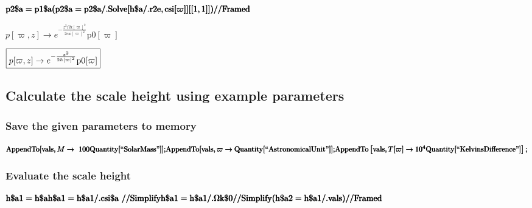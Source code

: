 \documentclass{article}
\begin{document}
\begin{doublespace}
\noindent\(\pmb{\text{p2$\$$a} =\text{p1$\$$a}}\\
\pmb{(\text{p2$\$$a} =\text{p2$\$$a} \text{/.} \text{Solve}[\text{h$\$$a} \text{/.} \text{r2e}, \text{csi}[\varpi ]][[1,1]]) \text{//}\text{Framed}}\)
\end{doublespace}

\begin{doublespace}
\noindent\(p[\varpi ,z]\to e^{-\frac{z^2 \text{$\Omega $k}[\varpi ]^2}{2 \text{csi}[\varpi ]^2}} \text{p0}[\varpi ]\)
\end{doublespace}

\begin{doublespace}
\noindent\(\fbox{$p[\varpi ,z]\to e^{-\frac{z^2}{2 h[\varpi ]^2}} \text{p0}[\varpi ]$}\)
\end{doublespace}

\subsection*{Calculate the scale height using example parameters}

\subsubsection*{Save the given parameters to memory}

\begin{doublespace}
\noindent\(\pmb{\text{AppendTo}[\text{vals},M \to \text{  }100\text{Quantity}[\text{{``}SolarMass{''}}]];}\\
\pmb{\text{AppendTo}[\text{vals},\varpi \to  \text{Quantity}[\text{{``}AstronomicalUnit{''}}]];}\\
\pmb{\text{AppendTo}\left[\text{vals},T[\varpi ]\to  10^4\text{Quantity}[\text{{``}KelvinsDifference{''}}]\right];}\)
\end{doublespace}

\subsubsection*{Evaluate the scale height}

\begin{doublespace}
\noindent\(\pmb{\text{h$\$$a1} = \text{h$\$$a}}\\
\pmb{\text{h$\$$a1} = \text{h$\$$a1} \text{/.} \text{csi$\$$a}\text{  }\text{//}\text{Simplify}}\\
\pmb{\text{h$\$$a1} = \text{h$\$$a1} \text{/.} \text{$\Omega $k$\$$0} \text{//}\text{Simplify}}\\
\pmb{(\text{h$\$$a2} =\text{h$\$$a1} \text{/.} \text{vals} ) \text{//}\text{Framed}}\)
\end{doublespace}
\end{document}
